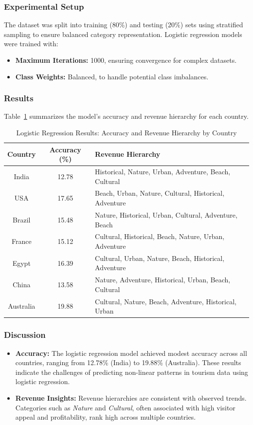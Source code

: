 \documentclass{article}
\begin{document}
\subsubsection{Experimental Setup}
The dataset was split into training (80\%) and testing (20\%) sets using stratified sampling to ensure balanced category representation. Logistic regression models were trained with:
\begin{itemize}
    \item \textbf{Maximum Iterations:} 1000, ensuring convergence for complex datasets.
    \item \textbf{Class Weights:} Balanced, to handle potential class imbalances.
\end{itemize}

\subsubsection{Results}
Table~\ref{tab:logistic_regression_summary} summarizes the model's accuracy and revenue hierarchy for each country.

\begin{table}[H]
\centering
\begin{tabular}{|c|c|l|}
\hline
\textbf{Country} & \textbf{Accuracy (\%)} & \textbf{Revenue Hierarchy} \\ \hline
India & 12.78 & Historical, Nature, Urban, Adventure, Beach, Cultural \\ 
USA & 17.65 & Beach, Urban, Nature, Cultural, Historical, Adventure \\ 
Brazil & 15.48 & Nature, Historical, Urban, Cultural, Adventure, Beach \\ 
France & 15.12 & Cultural, Historical, Beach, Nature, Urban, Adventure \\ 
Egypt & 16.39 & Cultural, Urban, Nature, Beach, Historical, Adventure \\ 
China & 13.58 & Nature, Adventure, Historical, Urban, Beach, Cultural \\ 
Australia & 19.88 & Cultural, Nature, Beach, Adventure, Historical, Urban \\ \hline
\end{tabular}
\caption{Logistic Regression Results: Accuracy and Revenue Hierarchy by Country}
\label{tab:logistic_regression_summary}
\end{table}

\subsubsection{Discussion}
\begin{itemize}
    \item \textbf{Accuracy:} The logistic regression model achieved modest accuracy across all countries, ranging from 12.78\% (India) to 19.88\% (Australia). These results indicate the challenges of predicting non-linear patterns in tourism data using logistic regression.
    \item \textbf{Revenue Insights:} Revenue hierarchies are consistent with observed trends. Categories such as \textit{Nature} and \textit{Cultural}, often associated with high visitor appeal and profitability, rank high across multiple countries.
\end{itemize}
\end{document}
